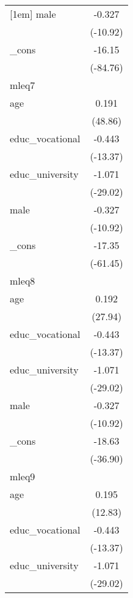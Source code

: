 {\begin{tabular}{l*{1}{c}}
[1em]
male        &      -0.327\sym{***}\\
            &    (-10.92)         \\
[1em]
\_cons      &      -16.15\sym{***}\\
            &    (-84.76)         \\
\hline
mleq7       &                     \\
age         &       0.191\sym{***}\\
            &     (48.86)         \\
[1em]
educ\_vocational&      -0.443\sym{***}\\
            &    (-13.37)         \\
[1em]
educ\_university&      -1.071\sym{***}\\
            &    (-29.02)         \\
[1em]
male        &      -0.327\sym{***}\\
            &    (-10.92)         \\
[1em]
\_cons      &      -17.35\sym{***}\\
            &    (-61.45)         \\
\hline
mleq8       &                     \\
age         &       0.192\sym{***}\\
            &     (27.94)         \\
[1em]
educ\_vocational&      -0.443\sym{***}\\
            &    (-13.37)         \\
[1em]
educ\_university&      -1.071\sym{***}\\
            &    (-29.02)         \\
[1em]
male        &      -0.327\sym{***}\\
            &    (-10.92)         \\
[1em]
\_cons      &      -18.63\sym{***}\\
            &    (-36.90)         \\
\hline
mleq9       &                     \\
age         &       0.195\sym{***}\\
            &     (12.83)         \\
[1em]
educ\_vocational&      -0.443\sym{***}\\
            &    (-13.37)         \\
[1em]
educ\_university&      -1.071\sym{***}\\
            &    (-29.02)         \\

\end{tabular}}
